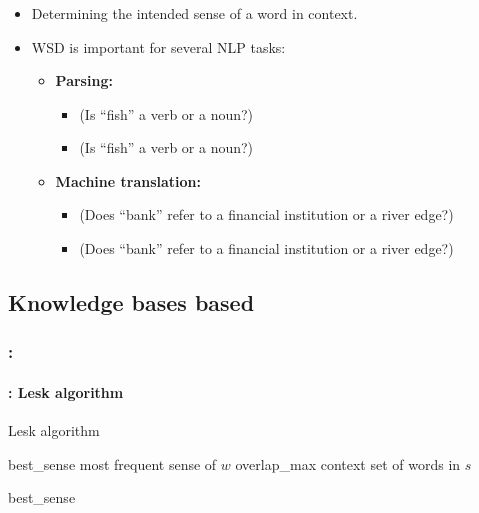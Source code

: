 \documentclass[xcolor=table]{beamer}
\begin{document}
\begin{frame}
	\frametitle{\insertshortsubtitle}
	\framesubtitle{\insertsection}
	
	\begin{itemize}
		\item Determining the intended sense of a word in context.
		\item WSD is important for several NLP tasks:
		\begin{itemize}
			\item \textbf{Parsing:}
			\begin{itemize}
				\item {} (Is ``fish'' a verb or a noun?)
				\item {} (Is ``fish'' a verb or a noun?)
			\end{itemize}
			\item \textbf{Machine translation:}
			\begin{itemize}
				\item {} (Does ``bank'' refer to a financial institution or a river edge?)
				\item {} (Does ``bank'' refer to a financial institution or a river edge?)
			\end{itemize}
		\end{itemize}
	\end{itemize}
	
\end{frame}

\subsection{Knowledge bases based}

\begin{frame}
	\frametitle{\insertshortsubtitle: \insertsection}
	\framesubtitle{\insertsubsection: Lesk algorithm}
	
	\begin{block}{Lesk algorithm}
		\footnotesize\vspace{-3pt}
		\begin{algorithm}[H]
			
			best\_sense \textleftarrow most frequent sense of $w$\;
			overlap\_max \;
			context \textleftarrow set of words in $s$\; 
			
			
			\Return best\_sense \;
		\end{algorithm}
	\end{block}
\end{frame}
\end{document}
